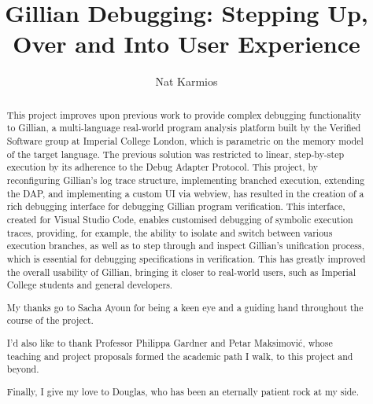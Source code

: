 \documentclass[a4paper, twoside]{report}
\title{Gillian Debugging: Stepping Up, Over and Into User Experience}
\author{Nat Karmios}
\begin{document}
\def\chapterautorefname{\normalcolor{Chapter}\color{blue}}
\def\sectionautorefname{\normalcolor{\S}\kern-0.7ex\color{blue}}
\def\subsectionautorefname{\normalcolor{\S}\kern-0.7ex\color{blue}}
\def\figureautorefname{\normalcolor{Figure}\color{blue}}
\def\lstnumberautorefname{\normalcolor{line}\color{blue}}
\newcommand{\sacha}[1]{\todo[color=green]{S: {#1}}}



\begin{abstract}
This project improves upon previous work to provide complex debugging functionality to
Gillian, a multi-language real-world program analysis platform built by the
Verified Software group at Imperial College London, which is parametric on the memory
model of the target language.
The previous solution was restricted to linear, step-by-step execution by its
adherence to the Debug Adapter Protocol. This project, by reconfiguring Gillian's log
trace structure, implementing branched execution, extending the DAP, and
implementing a custom UI via webview, has resulted in the creation of a rich debugging interface for debugging Gillian program verification.
This interface, created for Visual Studio Code, enables customised debugging of symbolic execution traces, providing, for example, the ability to isolate and switch between various execution branches, as well as to step through and inspect Gillian's unification process, which is essential for debugging specifications in verification. This has greatly improved the overall usability of Gillian, bringing it closer to real-world users, such as Imperial College students and general developers.
\end{abstract}

\renewcommand{\abstractname}{Acknowledgements}
\begin{abstract}
My thanks go to Sacha Ayoun for being a keen eye and a guiding hand throughout
the course of the project.

I'd also like to thank Professor Philippa Gardner and Petar Maksimović,
whose teaching and project proposals formed the academic path I walk, to this
project and beyond.

Finally, I give my love to Douglas, who has been an eternally patient rock at my
side.
\end{abstract}

\tableofcontents










\end{document}

